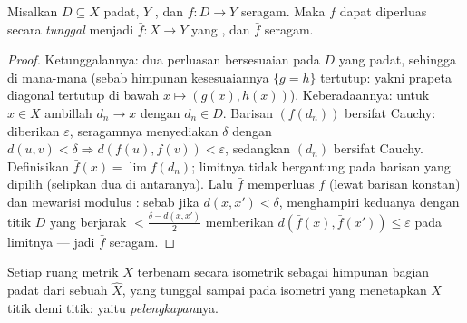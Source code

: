 \begin{theorem}
\label{thm:b3:complete:extension}
Misalkan $D \subseteq X$ padat, $Y$ , dan $f \colon D \to
Y$  seragam. Maka $f$ dapat diperluas secara \emph{tunggal} menjadi
$\bar f \colon X \to Y$ yang , dan $\bar f$ 
seragam.
\end{theorem}

\begin{proof}
Ketunggalannya: dua perluasan  bersesuaian pada $D$ yang padat,
sehingga di mana-mana (sebab himpunan kesesuaiannya $\{g = h\}$ tertutup:
yakni prapeta diagonal tertutup di bawah $x\mapsto(g(x), h(x))$).
Keberadaannya: untuk $x \in X$ ambillah $d_n \to x$ dengan $d_n \in D$.
Barisan $(f(d_n))$ bersifat Cauchy: diberikan $\varepsilon$, 
seragamnya menyediakan $\delta$ dengan $d(u,v) < \delta \Rightarrow
d(f(u), f(v)) < \varepsilon$, sedangkan $(d_n)$ bersifat Cauchy. Definisikan
$\bar f(x) = \lim f(d_n)$; limitnya tidak bergantung pada
barisan yang dipilih (selipkan dua di antaranya). Lalu $\bar f$ memperluas $f$
(lewat barisan konstan) dan mewarisi modulus : sebab jika
$d(x, x') < \delta$, menghampiri keduanya dengan titik $D$ yang berjarak
$< \frac{\delta - d(x,x')}2$ memberikan $d(\bar f(x), \bar
f(x')) \leq \varepsilon$ pada limitnya --- jadi $\bar f$ 
seragam.
\end{proof}

\begin{theorem}[Pelengkapan]\label{thm:b3:complete:completion}
Setiap ruang metrik $X$ terbenam secara isometrik sebagai himpunan bagian padat
dari sebuah  $\hat X$, yang tunggal sampai pada isometri yang menetapkan
$X$ titik demi titik: yaitu \emph{pelengkapan}nya.
\end{theorem}

